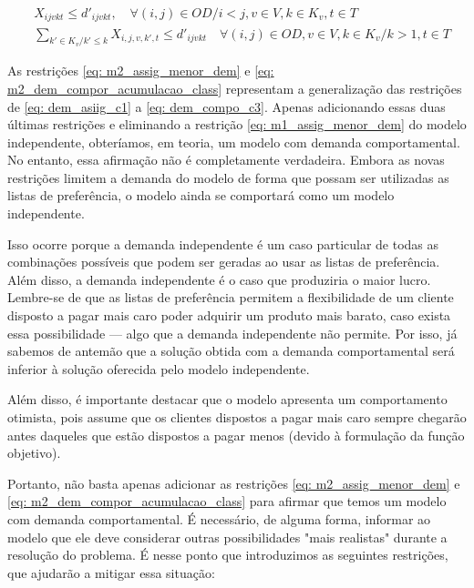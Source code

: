 \allowdisplaybreaks
\begin{align}
	& X_{ijvkt} \leq d'_{ijvkt},  \quad \forall (i,j) \in OD / i < j  ,v \in V, k \in K_v, t\in T                                                                                                 \label{eq: m2_assig_menor_dem}                                                 \\
	& \sum_{k' \in K_v / k' \leq k}X_{i,j,v,k',t} \leq d'_{ijvkt} \quad \forall (i,j) \in OD, v \in V, k \in K_v / k > 1, t\in T                                                                                    \label{eq: m2_dem_compor_acumulacao_class}                                     
\end{align}

As restrições \ref{eq: m2_assig_menor_dem} e \ref{eq: m2_dem_compor_acumulacao_class} representam a generalização das restrições de \ref{eq: dem_asiig_c1} a \ref{eq: dem_compo_c3}. Apenas adicionando essas duas últimas restrições e eliminando a restrição \ref{eq: m1_assig_menor_dem} do modelo independente, obteríamos, em teoria, um modelo com demanda comportamental. No entanto, essa afirmação não é completamente verdadeira. Embora as novas restrições limitem a demanda do modelo de forma que possam ser utilizadas as listas de preferência, o modelo ainda se comportará como um modelo independente.

Isso ocorre porque a demanda independente é um caso particular de todas as combinações possíveis que podem ser geradas ao usar as listas de preferência. Além disso, a demanda independente é o caso que produziria o maior lucro. Lembre-se de que as listas de preferência permitem a flexibilidade de um cliente disposto a pagar mais caro poder adquirir um produto mais barato, caso exista essa possibilidade — algo que a demanda independente não permite. Por isso, já sabemos de antemão que a solução obtida com a demanda comportamental será inferior à solução oferecida pelo modelo independente.

Além disso, é importante destacar que o modelo apresenta um comportamento otimista, pois assume que os clientes dispostos a pagar mais caro sempre chegarão antes daqueles que estão dispostos a pagar menos (devido à formulação da função objetivo).

Portanto, não basta apenas adicionar as restrições \ref{eq: m2_assig_menor_dem} e \ref{eq: m2_dem_compor_acumulacao_class} para afirmar que temos um modelo com demanda comportamental. É necessário, de alguma forma, informar ao modelo que ele deve considerar outras possibilidades "mais realistas" durante a resolução do problema. É nesse ponto que introduzimos as seguintes restrições, que ajudarão a mitigar essa situação:

